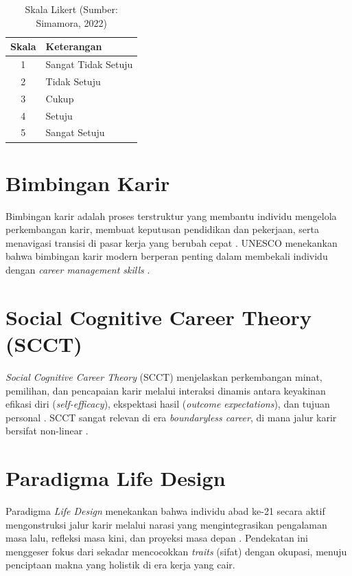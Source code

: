 \begin{table}[H]
\centering
\caption{Skala Likert (Sumber: Simamora, 2022)}
\label{tab:likert}
\begin{tabular}{cl}
\toprule
\textbf{Skala} & \textbf{Keterangan} \\
\midrule
1 & Sangat Tidak Setuju \\
2 & Tidak Setuju \\
3 & Cukup \\
4 & Setuju \\
5 & Sangat Setuju \\
\bottomrule
\end{tabular}
\end{table}

\section{Bimbingan Karir}
Bimbingan karir adalah proses terstruktur yang membantu individu mengelola
perkembangan karir, membuat keputusan pendidikan dan pekerjaan, serta menavigasi
transisi di pasar kerja yang berubah cepat \cite{OECD2021}. UNESCO menekankan bahwa
bimbingan karir modern berperan penting dalam membekali individu dengan
\textit{career management skills} \cite{UNESCO2021}.

\section{Social Cognitive Career Theory (SCCT)}
\textit{Social Cognitive Career Theory} (SCCT) menjelaskan perkembangan minat,
pemilihan, dan pencapaian karir melalui interaksi dinamis antara keyakinan efikasi diri
(\textit{self-efficacy}), ekspektasi hasil (\textit{outcome expectations}), dan tujuan
personal \cite{Brown2023}. SCCT sangat relevan di era \textit{boundaryless career},
di mana jalur karir bersifat non-linear \cite{Wang2022}.

\section{Paradigma Life Design}
Paradigma \textit{Life Design} menekankan bahwa individu abad ke-21 secara aktif
mengonstruksi jalur karir melalui narasi yang mengintegrasikan pengalaman masa lalu,
refleksi masa kini, dan proyeksi masa depan \cite{Savickas2020}. Pendekatan ini menggeser
fokus dari sekadar mencocokkan \textit{traits} (sifat) dengan okupasi, menuju penciptaan
makna yang holistik di era kerja yang cair.

